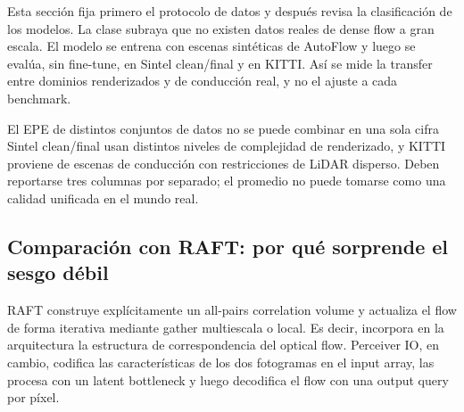 Esta sección fija primero el protocolo de datos y después revisa la clasificación de los modelos. La clase subraya que no existen datos reales de dense flow a gran escala. El modelo se entrena con escenas sintéticas de AutoFlow y luego se evalúa, sin fine-tune, en Sintel clean/final y en KITTI. Así se mide la transfer entre dominios renderizados y de conducción real, y no el ajuste a cada benchmark.


\begin{warningbox}{El EPE de distintos conjuntos de datos no se puede combinar en una sola cifra}
Sintel clean/final usan distintos niveles de complejidad de renderizado, y KITTI proviene de escenas de conducción con restricciones de LiDAR disperso. Deben reportarse tres columnas por separado; el promedio no puede tomarse como una calidad unificada en el mundo real.
\end{warningbox}


\subsection{Comparación con RAFT: por qué sorprende el sesgo débil}

RAFT construye explícitamente un all-pairs correlation volume y actualiza el flow de forma iterativa mediante gather multiescala o local. Es decir, incorpora en la arquitectura la estructura de correspondencia del optical flow. Perceiver IO, en cambio, codifica las características de los dos fotogramas en el input array, las procesa con un latent bottleneck y luego decodifica el flow con una output query por píxel.


